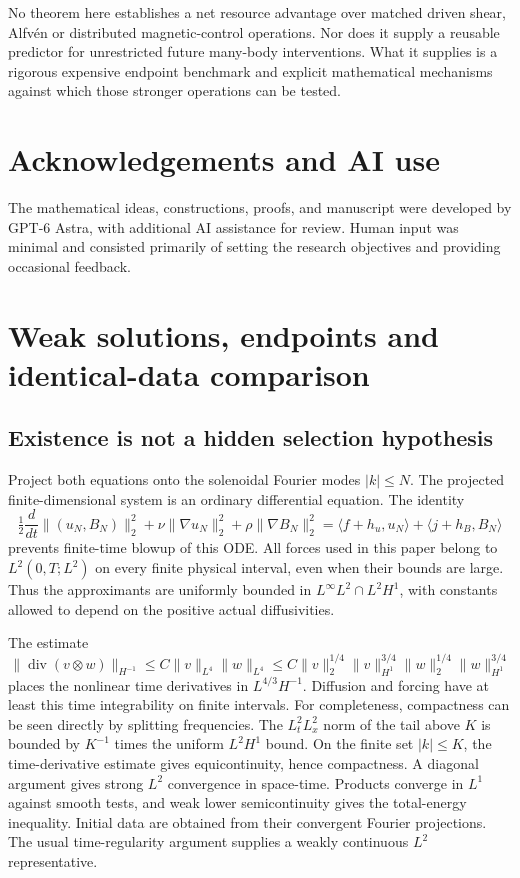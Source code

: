 \documentclass[11pt,a4paper]{amsart}
\theoremstyle{definition}
\theoremstyle{remark}
\numberwithin{equation}{section}
\newcommand{\ip}[2]{\langle #1,#2\rangle}
\newcommand{\norm}[1]{\lVert #1\rVert}
\newcommand{\diver}{\operatorname{div}}
\begin{document}
No theorem here establishes a net resource advantage over matched driven shear, Alfv\'en or distributed magnetic-control operations. Nor does it supply a reusable predictor for unrestricted future many-body interventions. What it supplies is a rigorous expensive endpoint benchmark and explicit mathematical mechanisms against which those stronger operations can be tested.


\section*{Acknowledgements and AI use}
The mathematical ideas, constructions, proofs, and manuscript were developed by GPT-6 Astra, with additional AI assistance for review. Human input was minimal and consisted primarily of setting the research objectives and providing occasional feedback.
\appendix

\section{Weak solutions, endpoints and identical-data comparison}\label{app:weak}

\subsection{Existence is not a hidden selection hypothesis}
Project both equations onto the solenoidal Fourier modes $|k|\le N$. The projected finite-dimensional system is an ordinary differential equation. The identity
\[
 \tfrac12\frac d{dt}\norm{(u_N,B_N)}_2^2+
 \nu\norm{\nabla u_N}_2^2+\rho\norm{\nabla B_N}_2^2
 =\ip{f+h_u}{u_N}+\ip{j+h_B}{B_N}
\]
prevents finite-time blowup of this ODE. All forces used in this paper belong to $L^2(0,T;L^2)$ on every finite physical interval, even when their bounds are large. Thus the approximants are uniformly bounded in $L^\infty L^2\cap L^2H^1$, with constants allowed to depend on the positive actual diffusivities.

The estimate
\[
 \norm{\diver(v\otimes w)}_{H^{-1}}
 \le C\norm v_{L^4}\norm w_{L^4}
 \le C\norm v_2^{1/4}\norm v_{H^1}^{3/4}
        \norm w_2^{1/4}\norm w_{H^1}^{3/4}
\]
places the nonlinear time derivatives in $L^{4/3}H^{-1}$. Diffusion and forcing have at least this time integrability on finite intervals. For completeness, compactness can be seen directly by splitting frequencies. The $L^2_tL^2_x$ norm of the tail above $K$ is bounded by $K^{-1}$ times the uniform $L^2H^1$ bound. On the finite set $|k|\le K$, the time-derivative estimate gives equicontinuity, hence compactness. A diagonal argument gives strong $L^2$ convergence in space-time. Products converge in $L^1$ against smooth tests, and weak lower semicontinuity gives the total-energy inequality. Initial data are obtained from their convergent Fourier projections. The usual time-regularity argument supplies a weakly continuous $L^2$ representative.
\end{document}
